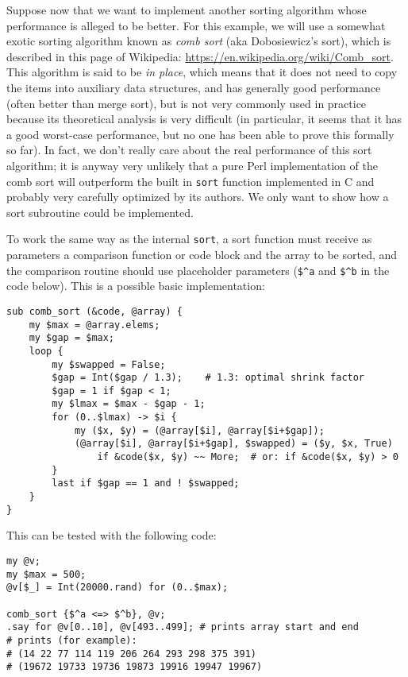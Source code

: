Suppose now that we want to implement another sorting 
algorithm whose performance is alleged to be better. 
For this example, we will use a somewhat exotic sorting 
algorithm known as \emph{comb sort} (aka Dobosiewicz's 
sort), which is described in this page of Wikipedia:
\url{https://en.wikipedia.org/wiki/Comb_sort}. This 
algorithm is said to be \emph{in place}, which means that 
it does not need to copy the items into auxiliary data 
structures, and has generally good performance (often better 
than merge sort), but is not very commonly used in 
practice because its theoretical analysis is very difficult 
(in particular, it seems that it has a good worst-case 
performance, but no one has been able to prove this 
formally so far). In fact, we don't really care about 
the real performance of this sort algorithm; it is 
anyway very unlikely that a pure Perl implementation 
of the comb sort will outperform the built in 
{\tt sort} function implemented in C and probably very 
carefully optimized by its authors. We only want to 
show how a sort subroutine could be implemented.

To work the same way as the internal {\tt sort}, a sort 
function must receive as parameters a comparison function 
or code block and the array to be sorted, and the 
comparison routine should use placeholder parameters (\verb'$^a' 
and  \verb'$^b' in the code below). This is a possible 
basic implementation:

\begin{verbatim}
sub comb_sort (&code, @array) {
    my $max = @array.elems;
    my $gap = $max;
    loop {
        my $swapped = False;
        $gap = Int($gap / 1.3);    # 1.3: optimal shrink factor
        $gap = 1 if $gap < 1;
        my $lmax = $max - $gap - 1;
        for (0..$lmax) -> $i {
            my ($x, $y) = (@array[$i], @array[$i+$gap]);
            (@array[$i], @array[$i+$gap], $swapped) = ($y, $x, True)
                if &code($x, $y) ~~ More;  # or: if &code($x, $y) > 0
        }
        last if $gap == 1 and ! $swapped;
    }
}
\end{verbatim}

This can be tested with the following code:

\begin{verbatim}
my @v;
my $max = 500;
@v[$_] = Int(20000.rand) for (0..$max);

comb_sort {$^a <=> $^b}, @v;
.say for @v[0..10], @v[493..499]; # prints array start and end
# prints (for example):
# (14 22 77 114 119 206 264 293 298 375 391)
# (19672 19733 19736 19873 19916 19947 19967)
\end{verbatim}

